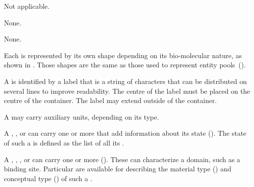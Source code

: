 \begin{glyphDescription}

\glyphSboTerm
Not applicable.

\glyphIncoming
None.

\glyphOutgoing
None.

\glyphContainer
Each  is represented by its own shape depending on its bio-molecular nature, as shown in .
Those shapes are the same as those used to represent entity pools~().

\glyphLabel
A  is identified by a label that is a string of characters that can be distributed on several lines to improve readability.
The centre of the label must be placed on the centre of the container.
The label may extend outside of the container.

\glyphAux A  may carry auxiliary units, depending on its type.

A , , or  can carry one or more  that add information about its state ().
The state of such a  is defined as the list of all its .

A , , , or  can carry one or more  ().
These can characterize a domain, such as a binding site.
Particular  are available for describing the material type () and conceptual type () of such a .

\end{glyphDescription}


